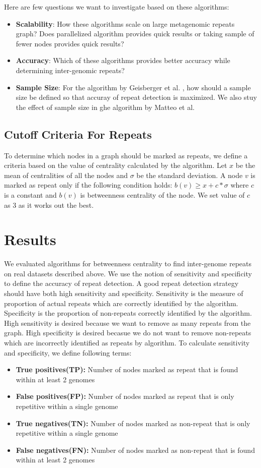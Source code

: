 \documentclass[runningheads,a4paper]{llncs}
\begin{document}
Here are few questions we want to investigate based on these algorithms:

\begin{itemize}
\item \textbf{Scalability}: How these algorithms scale on large metagenomic repeats graph? Does parallelized algorithm provides quick results or taking sample of fewer nodes provides quick results?
\item \textbf{Accuracy}: Which of these algorithms provides better accuracy while determining inter-genomic repeats?
\item \textbf{Sample Size}: For the algorithm by Geisberger et al. \cite{sanders}, how should a sample size be defined so that accuray of repeat detection is maximized. We also stuy the effect of sample size in ghe algorithm by Matteo et al.\cite{matteo}
\end{itemize}


\subsection*{Cutoff Criteria For Repeats}
To determine which nodes in a graph should be marked as repeats, we define a criteria based on the value of centrality calculated by the algorithm. Let $x$ be the mean of centralities of all the nodes and $\sigma$ be the standard deviation. A node $v$ is marked as repeat only if the following condition holds: $b(v) \geq x + c*\sigma$ where $c$ is a constant and $b(v)$ is betweenness centrality of the node. We set value of $c$ as 3 as it works out the best.

\section{Results} 
We evaluated algorithms for betweenness centrality to find inter-genome repeats on real datasets described above. We use the notion of sensitivity and specificity to define the accuracy of repeat detection. A good repeat detection strategy should have both high sensitivity and specificity. Sensitivity is the measure of proportion of actual repeats which are correctly identified by the algorithm. Specificity is the proportion of non-repeats correctly identified by the algorithm. High sensitivity is desired because we want to remove as many repeats from the graph. High specificity is desired becasue we do not want to remove non-repeats which are incorrectly identified as repeats by algorithm. To calculate sensitivity and specificity, we define following terms:
\begin{itemize}
\item \textbf{True positives(TP):} Number of nodes marked as repeat that is found within at least 2 genomes
\item \textbf{False positives(FP):} Number of nodes marked as repeat that is only repetitive within a single genome
\item \textbf{True negatives(TN):} Number of nodes marked as non-repeat that is only repetitive within a single genome
\item \textbf{False negatives(FN):} Number of nodes marked as non-repeat that is found within at least 2 genomes
\end{itemize}
\end{document}
